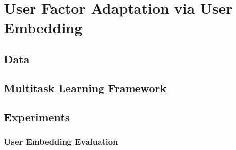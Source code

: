 

\section{User Factor Adaptation via User Embedding}

\subsection{Data}

\subsection{Multitask Learning Framework}

\subsection{Experiments}

\subsubsection{User Embedding Evaluation}

